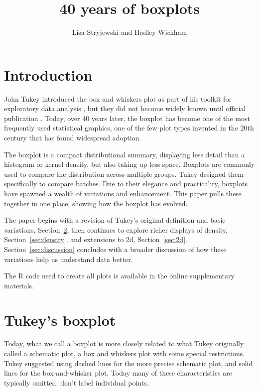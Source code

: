 \documentclass[oneside]{article}
\title{40 years of boxplots}
\author{Lisa Stryjewski and Hadley Wickham}
\begin{document}
\maketitle 

\section{Introduction}

\citep[pg. 164]{spear:1952}

John Tukey introduced the box and whiskers plot as part of his toolkit for  exploratory data analysis \citep{tukey:1970}, but they did not become widely known until official publication \citep{EDA}. Today, over 40 years later, the boxplot has become one of the most frequently used statistical graphics, one of the few plot types invented in the 20th century that has found widespread adoption. 

The boxplot is a compact distributional summary, displaying less detail than a histogram or kernel density, but also taking up less space. Boxplots are commonly used to compare the distribution across multiple groups. Tukey designed them specifically to compare batches. Due to their elegance and practicality, boxplots have spawned a wealth of variations and enhancement. This paper pulls these together in one place, showing how the boxplot has evolved.

The paper begins with a revision of Tukey's original definition and basic variations, Section~\ref{sec:tukey}, then continues to explore richer displays of density, Section~\ref{sec:density}, and extensions to 2d, Section~\ref{sec:2d}. Section~\ref{sec:discussion} concludes with a broader discussion of how these variations help us understand data better.

The R code used to create all plots is available in the online supplementary materials.

\section{Tukey's boxplot}
\label{sec:tukey}

Today, what we call a boxplot is more closely related to what Tukey originally called a schematic plot, a box and whiskers plot with some special restrictions. Tukey suggested using dashed lines for the more precise schematic plot, and solid lines for the box-and-whisker plot. Today many of these characteristics are typically omitted: don't label individual points.
\end{document}
